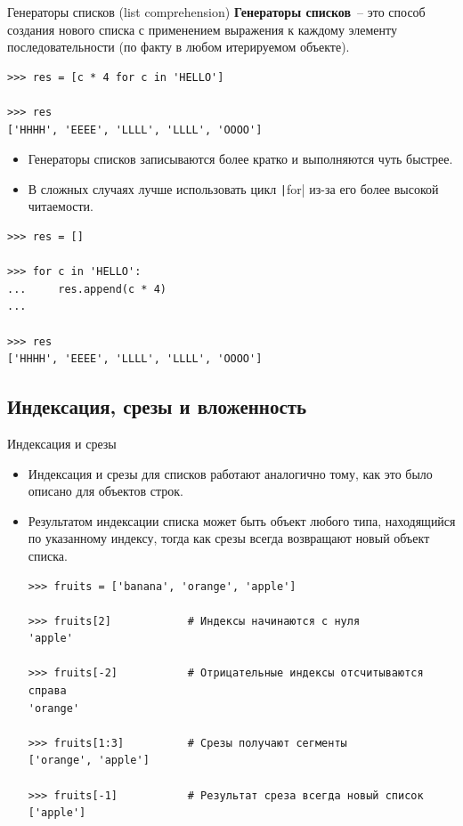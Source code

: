 \documentclass[aspectratio=169, mathserif]{beamer}%
\begin{document}
\begin{frame}[fragile]{Генераторы списков (list comprehension)}
\scriptsize
\textcolor{extraorange}{\textbf{Генераторы списков}}~-- это способ создания нового списка с применением выражения к каждому элементу последовательности (по факту в любом итерируемом объекте).

\begin{verbatim}
>>> res = [c * 4 for c in 'HELLO']

>>> res
['HHHH', 'EEEE', 'LLLL', 'LLLL', 'OOOO']
\end{verbatim}

\begin{itemize}
\item Генераторы списков записываются более кратко и выполняются чуть быстрее.

\item В сложных случаях лучше использовать цикл \texttt|for| из-за его более высокой читаемости.
\end{itemize}

\begin{verbatim}
>>> res = []

>>> for c in 'HELLO':
...     res.append(c * 4)
...

>>> res
['HHHH', 'EEEE', 'LLLL', 'LLLL', 'OOOO']
\end{verbatim}
\vfill
\end{frame}


\subsection{Индексация, срезы и вложенность}

\begin{frame}[fragile]{Индексация и срезы}
\scriptsize
\begin{itemize}
\item Индексация  и срезы для списков работают аналогично тому, как это было описано для объектов строк. 

\item Результатом индексации списка может быть объект любого типа, находящийся по указанному индексу, тогда как  срезы всегда возвращают новый объект списка.


\begin{verbatim}
>>> fruits = ['banana', 'orange', 'apple']

>>> fruits[2]            # Индексы начинаются с нуля
'apple'

>>> fruits[-2]           # Отрицательные индексы отсчитываются справа
'orange'

>>> fruits[1:3]          # Срезы получают сегменты
['orange', 'apple']

>>> fruits[-1]           # Результат среза всегда новый список
['apple']
\end{verbatim}
\end{itemize}
\vfill
\end{frame}
\end{document}
